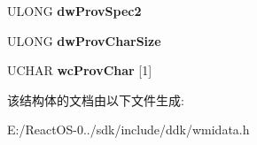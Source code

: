\begin{DoxyCompactItemize}
\mbox{\label{struct___s_e_r_i_a_l___w_m_i___c_o_m_m_p_r_o_p_a1e7918117c73ca5322b85e58099a8c86}} 
U\+L\+O\+NG {\bfseries dw\+Prov\+Spec2}
\item 
\mbox{\label{struct___s_e_r_i_a_l___w_m_i___c_o_m_m_p_r_o_p_a4f9f67ea5ba5308556773df012162567}} 
U\+L\+O\+NG {\bfseries dw\+Prov\+Char\+Size}
\item 
\mbox{\label{struct___s_e_r_i_a_l___w_m_i___c_o_m_m_p_r_o_p_ae0d1b7f48ba5643a8c559650e2cb9bda}} 
U\+C\+H\+AR {\bfseries wc\+Prov\+Char} \mbox{[}1\mbox{]}
\end{DoxyCompactItemize}


该结构体的文档由以下文件生成\+:\begin{DoxyCompactItemize}
\item 
E\+:/\+React\+O\+S-\/0../sdk/include/ddk/wmidata.\+h\end{DoxyCompactItemize}
